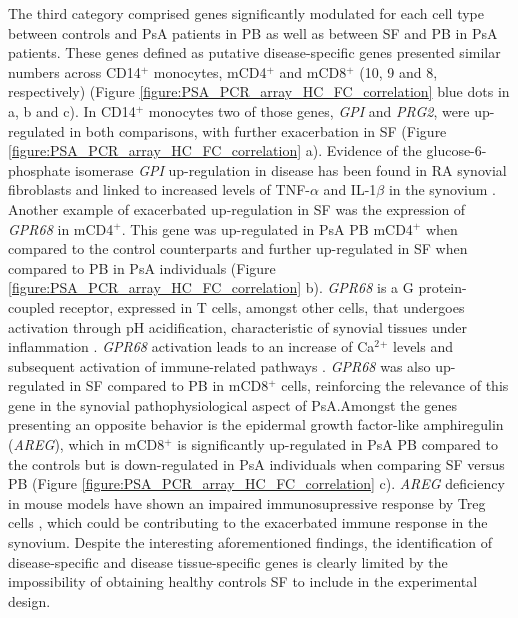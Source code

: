 The third category comprised genes significantly modulated for each cell type between controls and PsA patients in PB as well as between SF and PB in PsA patients. These genes defined as putative disease-specific genes presented similar numbers across CD14$^+$ monocytes, mCD4$^+$ and mCD8$^+$ (10, 9 and 8, respectively) (Figure \ref{figure:PSA_PCR_array_HC_FC_correlation} blue dots in a, b and c). In CD14$^+$ monocytes two of those genes, \textit{GPI} and \textit{PRG2}, were up-regulated in both comparisons, with further exacerbation in SF (Figure \ref{figure:PSA_PCR_array_HC_FC_correlation} a). Evidence of the glucose-6-phosphate isomerase \textit{GPI} up-regulation in disease has been found in RA synovial fibroblasts and linked to increased levels of TNF-$\alpha$ and IL-1$\beta$ in the synovium \parencite{Zhong2015}. %
Another example of exacerbated up-regulation in SF was the expression of \textit{GPR68} in mCD4$^+$. This gene was up-regulated in PsA PB mCD4$^+$ when compared to the control counterparts and further up-regulated in SF when compared to PB in PsA individuals (Figure \ref{figure:PSA_PCR_array_HC_FC_correlation} b). \textit{GPR68} is a G protein-coupled receptor, expressed in T cells, amongst other cells, that undergoes activation through pH acidification, characteristic of synovial tissues under inflammation \parencite{Biniecka2016}. \textit{GPR68} activation leads to an increase of Ca$^2$$^+$ levels and subsequent activation of immune-related pathways \parencite{Saxena2011}. \textit{GPR68} was also up-regulated in SF compared to PB in mCD8$^+$ cells, reinforcing the relevance of this gene in the synovial pathophysiological aspect of PsA.Amongst the genes presenting an opposite behavior is the epidermal growth factor-like amphiregulin (\textit{AREG}), which in mCD8$^+$ is significantly up-regulated in PsA PB compared to the controls but is down-regulated in PsA individuals when comparing SF versus PB (Figure \ref{figure:PSA_PCR_array_HC_FC_correlation} c). \textit{AREG} deficiency in mouse models have shown an impaired immunosupressive response by Treg cells \parencite{Zaiss2013}, which could be contributing to the exacerbated immune response in the synovium. 
Despite the interesting aforementioned findings, the identification of disease-specific and disease tissue-specific genes is clearly limited by the impossibility of obtaining healthy controls SF to include in the experimental design.

